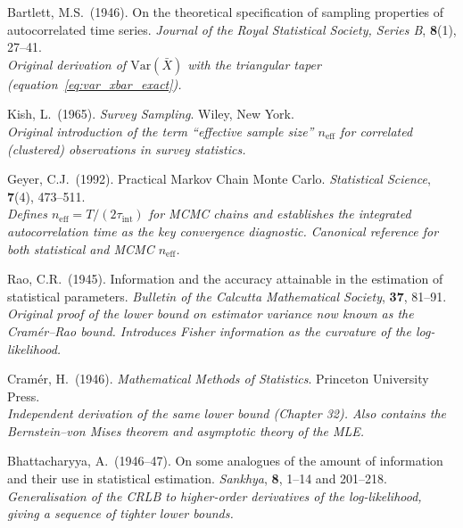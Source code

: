 \documentclass[11pt, a4paper]{article}
\begin{document}
\begin{description}[leftmargin=0pt, itemsep=4pt]

\item[Bartlett (1946)]
Bartlett, M.S.\ (1946).
On the theoretical specification of sampling properties of autocorrelated time
series.
\textit{Journal of the Royal Statistical Society, Series B}, \textbf{8}(1), 27--41.\\
\textit{Original derivation of $\mathrm{Var}(\bar{X})$ with the triangular taper
(equation~\eqref{eq:var_xbar_exact}).}

\item[Kish (1965)]
Kish, L.\ (1965).
\textit{Survey Sampling}.
Wiley, New York.\\
\textit{Original introduction of the term ``effective sample size'' $n_\mathrm{eff}$
for correlated (clustered) observations in survey statistics.}

\item[Geyer (1992)]
Geyer, C.J.\ (1992).
Practical Markov Chain Monte Carlo.
\textit{Statistical Science}, \textbf{7}(4), 473--511.\\
\textit{Defines $n_\mathrm{eff} = T/(2\tau_\mathrm{int})$ for MCMC chains and
establishes the integrated autocorrelation time as the key convergence diagnostic.
Canonical reference for both statistical and MCMC $n_\mathrm{eff}$.}

\item[Rao (1945)]
Rao, C.R.\ (1945).
Information and the accuracy attainable in the estimation of statistical parameters.
\textit{Bulletin of the Calcutta Mathematical Society}, \textbf{37}, 81--91.\\
\textit{Original proof of the lower bound on estimator variance now known as
the Cram\'er--Rao bound. Introduces Fisher information as the curvature of the
log-likelihood.}

\item[Cram\'er (1946)]
Cram\'er, H.\ (1946).
\textit{Mathematical Methods of Statistics}.
Princeton University Press.\\
\textit{Independent derivation of the same lower bound (Chapter 32). Also contains
the Bernstein--von Mises theorem and asymptotic theory of the MLE.}

\item[Bhattacharyya (1946)]
Bhattacharyya, A.\ (1946--47).
On some analogues of the amount of information and their use in statistical
estimation.
\textit{Sankhya}, \textbf{8}, 1--14 and 201--218.\\
\textit{Generalisation of the CRLB to higher-order derivatives of the
log-likelihood, giving a sequence of tighter lower bounds.}


\end{description}
\end{document}
